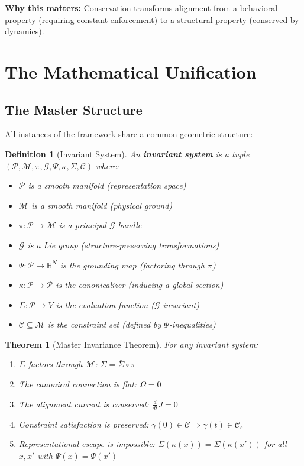 \documentclass[12pt]{article}
\newtheorem{theorem}{Theorem}[section]
\newtheorem{definition}{Definition}[section]
\begin{document}
\textbf{Why this matters:} Conservation transforms alignment from a behavioral property (requiring constant enforcement) to a structural property (conserved by dynamics).

\section{The Mathematical Unification}

\subsection{The Master Structure}

All instances of the framework share a common geometric structure:

\begin{definition}[Invariant System]
An \textbf{invariant system} is a tuple $(\mathcal{P}, \mathcal{M}, \pi, \mathcal{G}, \Psi, \kappa, \Sigma, \mathcal{C})$ where:
\begin{itemize}
    \item $\mathcal{P}$ is a smooth manifold (representation space)
    \item $\mathcal{M}$ is a smooth manifold (physical ground)
    \item $\pi : \mathcal{P} \to \mathcal{M}$ is a principal $\mathcal{G}$-bundle
    \item $\mathcal{G}$ is a Lie group (structure-preserving transformations)
    \item $\Psi : \mathcal{P} \to \mathbb{R}^N$ is the grounding map (factoring through $\pi$)
    \item $\kappa : \mathcal{P} \to \mathcal{P}$ is the canonicalizer (inducing a global section)
    \item $\Sigma : \mathcal{P} \to V$ is the evaluation function ($\mathcal{G}$-invariant)
    \item $\mathcal{C} \subseteq \mathcal{M}$ is the constraint set (defined by $\Psi$-inequalities)
\end{itemize}
\end{definition}

\begin{theorem}[Master Invariance Theorem]
\textit{For any invariant system:}
\begin{enumerate}[label=(\alph*)]
    \item $\Sigma$ factors through $\mathcal{M}$: $\Sigma = \bar{\Sigma} \circ \pi$
    \item The canonical connection is flat: $\Omega = 0$
    \item The alignment current is conserved: $\frac{d}{dt} J = 0$
    \item Constraint satisfaction is preserved: $\gamma(0) \in \mathcal{C} \Rightarrow \gamma(t) \in \mathcal{C}_\varepsilon$
    \item Representational escape is impossible: $\Sigma(\kappa(x)) = \Sigma(\kappa(x'))$ for all $x, x'$ with $\Psi(x) = \Psi(x')$
\end{enumerate}
\end{theorem}
\end{document}
